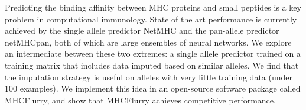 Predicting the binding affinity between MHC proteins and small peptides is a key problem in computational immunology. State of the art performance is currently achieved by the single allele predictor NetMHC and the pan-allele predictor netMHCpan, both of which are large ensembles of neural networks. We explore an intermediate between these two extremes: a single allele predictor trained on a training matrix that includes data imputed based on similar alleles. We find that the imputation strategy is useful on alleles with very little training data (under 100 examples). We implement this idea in an open-source software package called MHCFlurry, and show that MHCFlurry achieves competitive performance. 
